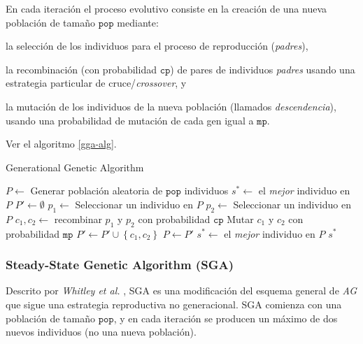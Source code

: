 En cada iteración el proceso evolutivo consiste en la creación de una nueva población de tamaño $\texttt{pop}$ mediante:
\begin{inparaenum}
\item la selección de los individuos para el proceso de reproducción (\emph{padres}),
\item la recombinación (con probabilidad $\texttt{cp}$) de pares de individuos \emph{padres} usando una estrategia particular de cruce/\emph{crossover}, y
\item la mutación de los individuos de la nueva población (llamados \emph{descendencia}), usando una probabilidad de mutación de cada gen igual a $\texttt{mp}$.
\end{inparaenum}
Ver el algoritmo \ref{gga-alg}.

\begin{algorithm}
\caption{Generational Genetic Algorithm}
\label{gga-alg}
\begin{algorithmic}[1]


\State $P \gets$ Generar población aleatoria de $\texttt{pop}$ individuos
\State $s^* \gets $ el \emph{mejor} individuo en $P$
	\State $P' \gets \emptyset$
		\State $p_1 \gets$ Seleccionar un individuo en $P$
		\State $p_2 \gets$ Seleccionar un individuo en $P$
		\State $c_1, c_2 \gets $ recombinar $p_1$ y $p_2$ con probabilidad $\texttt{cp}$
		\State Mutar $c_1$ y $c_2$ con probabilidad $\texttt{mp}$
		\State $P' \gets P' \cup \left\lbrace c_1, c_2 \right\rbrace$
	\EndWhile
	\State $P \gets P'$
		\State $s^* \gets$ el \emph{mejor} individuo en $P$
	\EndIf
\EndWhile
\State \Return $s^*$

\end{algorithmic}
\end{algorithm}

\subsubsection{Steady-State Genetic Algorithm (SGA)}

Descrito por \emph{Whitley et al.} \cite{whitley1988genitor}, SGA es una modificación del esquema general de \emph{AG} que sigue una estrategia reproductiva no generacional. SGA comienza con una población de tamaño $\texttt{pop}$, y en cada iteración se producen un máximo de dos nuevos individuos (no una nueva población).

